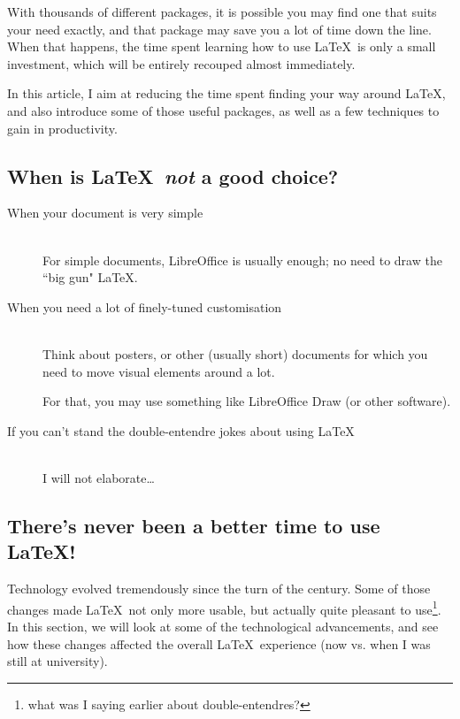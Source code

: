 \begin{description}
	With thousands of different packages, it is possible you may find one that suits your need exactly, and that package may save you a lot of time down the line. When that happens, the time spent learning how to use \LaTeX\ is only a small investment, which will be entirely recouped almost immediately.
	
	In this article, I aim at reducing the time spent finding your way around \LaTeX, and also introduce some of those useful packages, as well as a few techniques to gain in productivity.
\end{description}



\subsection{When is \LaTeX\ \emph{not} a good choice?}

\begin{description}
	\item[When your document is very simple] \mbox{} \\
	For simple documents, LibreOffice is usually enough; no need to draw the ``big gun" \LaTeX.
	
	\item[When you need a lot of finely-tuned customisation] \mbox{} \\
	Think about posters, or other (usually short) documents for which you need to move visual elements around a lot.
	
	For that, you may use something like LibreOffice Draw (or other software).
	
	\item[If you can't stand the double-entendre jokes about using \LaTeX] \mbox{} \\
	I will not elaborate\dots\
\end{description}



\subsection{There's never been a better time to use \LaTeX!}

Technology evolved tremendously since the turn of the century. Some of those changes made \LaTeX\ not only more usable, but actually quite pleasant to use\footnote{what was I saying earlier about double-entendres?}. \\

In this section, we will look at some of the technological advancements, and see how these changes affected the overall \LaTeX\ experience (now vs. when I was still at university).

